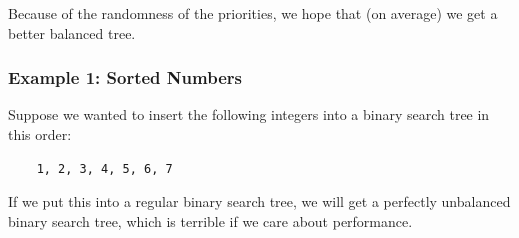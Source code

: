 \documentclass[letterpaper]{article}
\begin{document}
\bigskip 

Because of the randomness of the priorities, we hope that (on average) we get a better balanced tree. 

\subsubsection{Example 1: Sorted Numbers}
Suppose we wanted to insert the following integers into a binary search tree in this order: 
\begin{verbatim}
    1, 2, 3, 4, 5, 6, 7
\end{verbatim}
If we put this into a regular binary search tree, we will get a perfectly unbalanced binary search tree, which is terrible if we care about performance. 

\bigskip 
\end{document}
